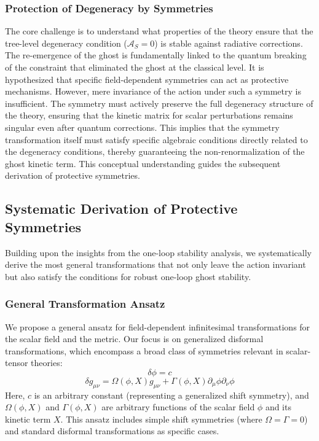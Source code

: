\documentclass[twocolumn]{aastex631}
\begin{document}
\subsubsection{Protection of Degeneracy by Symmetries}
The core challenge is to understand what properties of the theory ensure that the tree-level degeneracy condition ($\mathcal{A}_S=0$) is stable against radiative corrections. The re-emergence of the ghost is fundamentally linked to the quantum breaking of the constraint that eliminated the ghost at the classical level. It is hypothesized that specific field-dependent symmetries can act as protective mechanisms. However, mere invariance of the action under such a symmetry is insufficient. The symmetry must actively preserve the full degeneracy structure of the theory, ensuring that the kinetic matrix for scalar perturbations remains singular even after quantum corrections. This implies that the symmetry transformation itself must satisfy specific algebraic conditions directly related to the degeneracy conditions, thereby guaranteeing the non-renormalization of the ghost kinetic term. This conceptual understanding guides the subsequent derivation of protective symmetries.

\subsection{Systematic Derivation of Protective Symmetries}
Building upon the insights from the one-loop stability analysis, we systematically derive the most general transformations that not only leave the action invariant but also satisfy the conditions for robust one-loop ghost stability.

\subsubsection{General Transformation Ansatz}
We propose a general ansatz for field-dependent infinitesimal transformations for the scalar field and the metric. Our focus is on generalized disformal transformations, which encompass a broad class of symmetries relevant in scalar-tensor theories:
$$ \delta\phi = c $$
$$ \delta g_{\mu\nu} = \Omega(\phi, X) g_{\mu\nu} + \Gamma(\phi, X) \partial_\mu\phi \partial_\nu\phi $$
Here, $c$ is an arbitrary constant (representing a generalized shift symmetry), and $\Omega(\phi, X)$ and $\Gamma(\phi, X)$ are arbitrary functions of the scalar field $\phi$ and its kinetic term $X$. This ansatz includes simple shift symmetries (where $\Omega=\Gamma=0$) and standard disformal transformations as specific cases.
\end{document}
